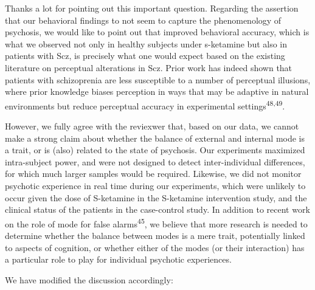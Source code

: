\documentclass[
]{article}
\begin{document}
Thanks a lot for pointing out this important question. Regarding the
assertion that our behavioral findings to not seem to capture the
phenomenology of psychosis, we would like to point out that improved
behavioral accuracy, which is what we observed not only in healthy
subjects under s-ketamine but also in patients with Scz, is precisely
what one would expect based on the existing literature on perceptual
alterations in Scz. Prior work has indeed shown that patients with
schizoprenia are less susceptible to a number of perceptual illusions,
where prior knowledge biases perception in ways that may be adaptive in
natural environments but reduce perceptual accuracy in experimental
settings\textsuperscript{48,49}.

However, we fully agree with the reviexwer that, based on our data, we
cannot make a strong claim about whether the balance of external and
internal mode is a trait, or is (also) related to the state of
psychosis. Our experiments maximized intra-subject power, and were not
designed to detect inter-individual differences, for which much larger
samples would be required. Likewise, we did not monitor psychotic
experience in real time during our experiments, which were unlikely to
occur given the dose of S-ketamine in the S-ketamine intervention study,
and the clinical status of the patients in the case-control study. In
addition to recent work on the role of mode for false
alarms\textsuperscript{45}, we believe that more research is needed to
determine whether the balance between modes is a mere trait, potentially
linked to aspects of cognition, or whether either of the modes (or their
interaction) has a particular role to play for individual psychotic
experiences.

We have modified the discussion accordingly:
\end{document}
